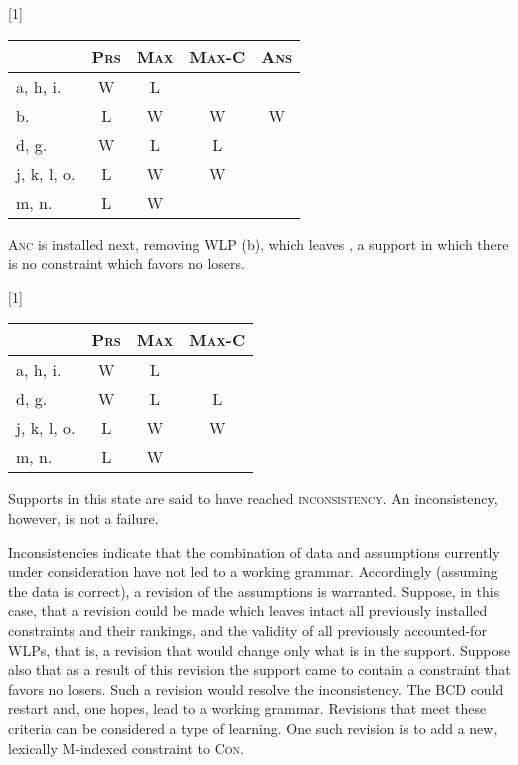 \documentclass[output=paper,
modfonts
]{LSP/langsci}
\begin{document}
\ea \label{ex:round:36} 
\renewcommand*\arraystretch{1.2}
\scalebox{1}[1]{\begin{tabular}[t]{|l||c||c|c|c|}
\firsthline & \textsc{Prs} & \textsc{Max} & \textsc{Max-C} & \textsc{Ans} \\
\hline
\hline a, h, i. & W & L & & \\
\hline b. & L & W & W & W \\
\hline d, g. & W &  L & L &  \\
\hline j, k, l, o. & L & W & W &  \\
\hline m, n. & L & W & & \\
\hline \end{tabular}} \renewcommand*\arraystretch{1}
\z

\textsc{Anc} is installed next, removing WLP (b), which leaves , a support in which there is no constraint which favors no losers. 

\ea \label{ex:round:37} 
\renewcommand*\arraystretch{1.2}
\scalebox{1}[1]{\begin{tabular}[t]{|l||c||c|c|}
\firsthline & \textsc{Prs} & \textsc{Max} & \textsc{Max-C} \\
\hline
\hline a, h, i. & W & L & \\
\hline d, g. & W & L & L  \\
\hline j, k, l, o. & L & W & W \\
\hline m, n. & L & W & \\
\hline \end{tabular}} \renewcommand*\arraystretch{1}
\z

\noindent Supports in this state are said to have reached \textsc{inconsistency}. An inconsistency, however, is not a failure. 

Inconsistencies indicate that the combination of data and assumptions currently under consideration have not led to a working grammar. Accordingly (assuming the data is correct), a revision of the assumptions is warranted. Suppose, in this case, that a revision could be made which leaves intact all previously installed constraints and their rankings, and the validity of all previously accounted-for WLPs, that is, a revision that would change only what is in the support. Suppose also that as a result of this revision the support came to contain a constraint that favors no losers. Such a revision would resolve the inconsistency. The BCD could restart and, one hopes, lead to a working grammar. Revisions that meet these criteria can be considered a type of learning. One such revision is to add a new, lexically M-indexed constraint to \textsc{Con}. 
\end{document}
